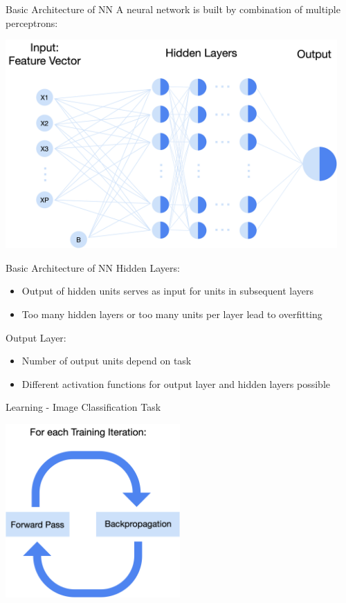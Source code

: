 \documentclass[11pt,compress,t,notes=noshow, xcolor=table]{beamer}
\begin{document}
\begin{vbframe}{Basic Architecture of NN}
\small A neural network is built by combination of multiple perceptrons:

\vspace{0.5cm}
\includegraphics[width = 0.95\textwidth]{figure_man/nutshell-nn-basic-architecture.png}    
\end{vbframe}

\begin{vbframe}{Basic Architecture of NN}
Hidden Layers: 
     \begin{itemize}
         \item  Output of hidden units serves as input for units in subsequent layers
         \item Too many hidden layers or too many units per layer lead to overfitting
     \end{itemize}
Output Layer:
    \begin{itemize}
        \item Number of output units depend on task
        \item Different activation functions for output layer and hidden layers possible
    \end{itemize}

\end{vbframe}

\begin{vbframe}{Learning - Image Classification Task}
\vspace{0.5cm}
\begin{center}
    \includegraphics[width = 0.5\textwidth]{figure_man/nutshell-nn-learning-iteration.png}   
\end{center}

\end{vbframe}
\end{document}
